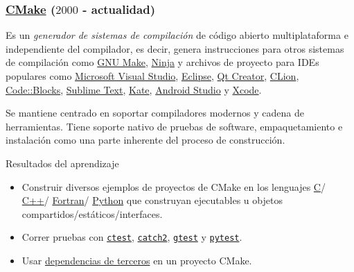 




\begin{frame}[fragile]
	\frametitle{\href{https://cmake.org}{CMake} ($2000$ - actualidad)}
	Es un \emph{generador de sistemas de compilación} de código
	abierto multiplataforma e independiente del compilador, es decir,
	genera instrucciones para otros sistemas de compilación como
	\href{https://www.gnu.org/software/make}{GNU Make},
	\href{https://ninja-build.org}{Ninja}
	y archivos de proyecto para IDEs populares como
	\href{https://visualstudio.microsoft.com}{Microsoft Visual Studio},
	\href{https://eclipseide.org}{Eclipse},
	\href{https://www.qt.io/product/development-tools}{Qt Creator},
	\href{https://www.jetbrains.com/clion}{CLion},
	\href{https://www.codeblocks.org}{Code::Blocks},
	\href{https://www.sublimetext.com}{Sublime Text},
	\href{https://kate-editor.org}{Kate},
	\href{https://developer.android.com/studio}{Android Studio} y
	\href{https://developer.apple.com/xcode}{Xcode}.

	Se mantiene centrado en soportar compiladores modernos y cadena
	de herramientas.
	Tiene soporte nativo de pruebas de software, empaquetamiento e
	instalación como una parte inherente del proceso de construcción.

	\begin{block}{Resultados del aprendizaje}
		\begin{itemize}
			\item
			
			Construir diversos ejemplos de proyectos de CMake en los
			lenguajes
			\href{https://www.open-std.org/jtc1/sc22/wg14}{C}/
			\href{https://isocpp.org}{C++}/
			\href{https://fortran-lang.org}{Fortran}/
			\href{https://www.python.org}{Python} que construyan
			ejecutables u objetos compartidos/estáticos/interfaces.
			
			\item
			
			Correr pruebas con
			\href{https://cmake.org/cmake/help/latest/manual/ctest.1.html}{\lstinline{ctest}},
			\href{https://github.com/catchorg/Catch2}{\lstinline{catch2}},
			\href{https://github.com/google/googletest}{\lstinline{gtest}} y
			\href{https://github.com/pytest-dev/pytest}{\lstinline{pytest}}.
			
			\item
			
			Usar
			\href{https://conan.io/center/recipes}{dependencias de terceros}
			en un proyecto CMake.
		\end{itemize}
	\end{block}


\end{frame}
